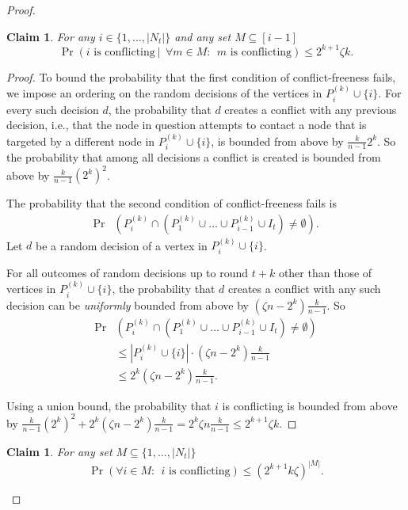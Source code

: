 \documentclass[12pt]{article}
\newtheorem{claim}[theorem]{Claim}
\begin{document}
{\begin{proof}
\begin{claim}\label{cl:1}
For any $i \in \{1, \dots , |N_t|\}$ and any set $M \subseteq [i-1]$
$$\Pr\left( i \mbox { is conflicting}\ |\ \ \forall m \in M: \ \ m \mbox { is conflicting}\right) \leq 2^{k+1} \zeta k .$$
\end{claim}

\begin{proof}
To bound the probability that the first condition of conflict-freeness fails, we impose an ordering on the random decisions of the vertices in $P^{(k)}_i\cup\{i\}$.
For every such decision $d$, the probability that $d$ creates a conflict with any previous decision, i.e., that the node in question attempts to contact a node that is targeted by a different node in $P^{(k)}_i\cup\{i\}$, is bounded from above by $\frac{k}{n-1}2^k$. 
So the probability that among all decisions a conflict is created is bounded from above by $\frac{k}{n-1}(2^k)^2$.

The probability that the second condition of conflict-freeness fails is
\begin{align*}
\Pr&\left(P^{(k)}_i\cap \left(P^{(k)}_1 \cup \dots \cup P^{(k)}_{i-1} \cup I_{t}\right) \neq \emptyset \right).
\end{align*}
Let $d$ be a random decision of a vertex in $P^{(k)}_i\cup\{i\}$.

 For all outcomes of random decisions up to round $t+k$ other than those of vertices in $P^{(k)}_i\cup\{i\}$, the probability that $d$ creates a conflict with any such decision can be \emph{uniformly} bounded from above by $\left(\zeta n - 2^k\right)\frac{k}{n-1}$. So 
\begin{align*}
\Pr&\left(P^{(k)}_i\cap \left(P^{(k)}_1 \cup \dots \cup P^{(k)}_{i-1} \cup I_{t}\right) \neq \emptyset \right)\\
&\leq \left|P^{(k)}_i\cup\{i\}\right|\cdot\left(\zeta n - 2^k\right)\tfrac{k}{n-1}\\
&\leq 2^k \left(\zeta n - 2^k\right)\tfrac{k}{n-1}.
\end{align*}

Using a union bound, the probability that $i$ is conflicting is bounded from above by
$
\frac{k}{n-1}(2^k)^2 + 2^k \left(\zeta n - 2^k\right)\frac{k}{n-1} 
= 2^k \zeta n \frac{k}{n-1}
\leq 2^{k+1} \zeta k.
$ 
\end{proof}


\begin{claim}\label{cl:2}
For any set $M \subseteq \{1, \dots , |N_t|\}$
$$ \Pr\left(\forall i \in M: \ \ i\mbox{ is conflicting}\right)
\leq \left(2^{k+1}k\zeta\right)^{|M|}.$$
\end{claim}


\end{proof}}
\end{document}

